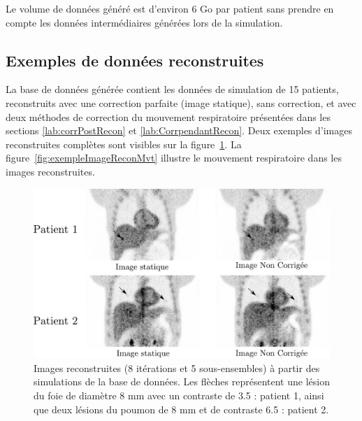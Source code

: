 Le volume de données généré est d'environ 6 Go par patient sans prendre en compte les données intermédiaires générées lors de la simulation.

\subsection{Exemples de données reconstruites}

La base de données générée contient les données de simulation de 15 patients, reconstruits avec une correction parfaite (image statique), sans correction, et avec deux méthodes de correction du mouvement respiratoire présentées dans les sections \ref{lab:corrPostRecon} et \ref{lab:CorrpendantRecon}. Deux exemples d'images reconstruites complètes sont visibles sur la figure~\ref{fig:exempleImageRecon}. La figure~\ref{fig:exempleImageReconMvt} illustre le mouvement respiratoire dans les images reconstruites.

\begin{figure}
 \centering
 \includegraphics[width=15cm]{images/exempleImageRecon}
 \caption[Images reconstruites tirées de la base de donnée]{Images reconstruites (8 itérations et 5 sous-ensembles) à partir des simulations de la base de données. Les flèches représentent une lésion du foie de diamètre 8 mm avec un contraste de 3.5 : patient 1, ainsi que deux lésions du poumon de 8 mm et de contraste 6.5 : patient 2.}
 \label{fig:exempleImageRecon}
\end{figure}

